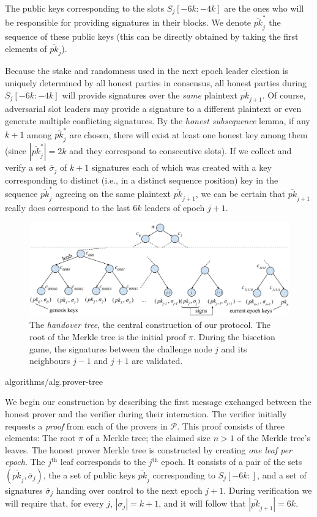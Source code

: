 The public keys corresponding to the slots $S_j[-6k{:}-4k]$ are
the ones who will be responsible for providing signatures in their
blocks. We denote $\overline{pk}^*_j$ the sequence of these public keys
(this can be directly obtained by taking the first elements of $\overline{pk}_j$).

Because the stake and randomness used
in the next epoch leader election is uniquely
determined by all honest parties in consensus, all honest parties during
$S_j[-6k{:}-4k]$ will provide signatures over the \emph{same} plaintext
$\overline{pk}_{j+1}$. Of course, adversarial slot leaders may provide a signature
to a different plaintext or even generate multiple conflicting signatures.
By the \emph{honest subsequence} lemma, if
any $k+1$ among $\overline{pk}^*_j$
are chosen, there will exist at least one
honest key among them (since $|\overline{pk}^*_j| = 2k$ and they correspond to consecutive
slots). If we collect and verify a set $\overline{\sigma}_j$ of $k+1$ signatures
each of which was created with a key corresponding to distinct (i.e., in a distinct
sequence position) key in the sequence $\overline{pk}^*_j$ agreeing on the same
plaintext $\overline{pk}_{j+1}$, we can be certain that
$\overline{pk}_{j+1}$ really does correspond to the last $6k$ leaders of epoch
$j+1$.

\begin{figure}[h]
    \centering
    \includegraphics[width=0.8 \textwidth,keepaspectratio]{figures/popos-tree.pdf}
    \caption{The \emph{handover tree}, the central construction of our protocol.
             The root of the Merkle tree is the initial proof $\pi$. During the bisection
             game, the signatures between the challenge node $j$ and its neighbours
             $j-1$ and $j+1$ are validated.}
    \label{fig.popos-tree}
\end{figure}

{algorithms/alg.prover-tree}

We begin our construction by describing the first message exchanged between the
honest prover and the verifier during their interaction. The verifier initially
requests a \emph{proof} from each of the provers in $\mathcal{P}$. This proof
consists of three elements: The root $\pi$ of a Merkle tree; the claimed size
$n > 1$ of the Merkle tree's leaves.
The honest prover Merkle tree is constructed by creating \emph{one leaf per epoch}.
The $j^\text{th}$ leaf corresponds to the $j^\text{th}$ epoch. It consists of a pair of the sets
$(\overline{pk}_j, \overline{\sigma}_j)$, the a set
of public keys $\overline{pk}_j$ corresponding to $S_j[-6k{:}]$,
and a set of signatures $\overline{\sigma}_j$ handing over control to the next epoch $j+1$.
During verification we will require that, for every $j$, 
$|\overline{\sigma}_j| = k + 1$, and it will follow that
$|\overline{pk}_{j+1}| = 6k$.

